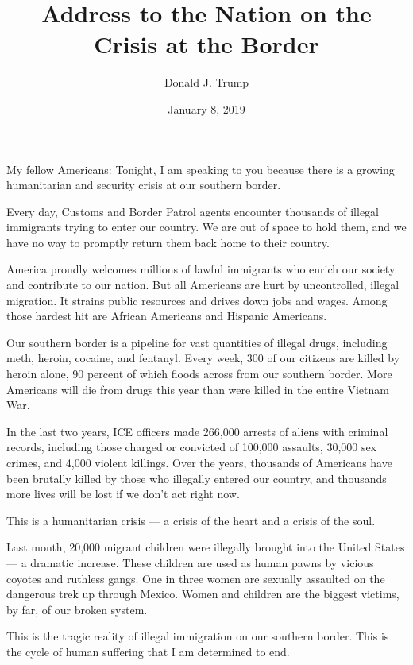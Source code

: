 \documentclass[10pt,a4paper]{article}
\begin{document}
\title{Address to the Nation on the Crisis at the Border}
\date{January 8, 2019}
\author{Donald J. Trump}

\maketitle

\noindent\linenumbers My fellow Americans: Tonight, I am speaking to you because there is a growing humanitarian and security crisis at our southern border.

Every day, Customs and Border Patrol agents encounter thousands of illegal immigrants trying to enter our country.  We are out of space to hold them, and we have no way to promptly return them back home to their country.

America proudly welcomes millions of lawful immigrants who enrich our society and contribute to our nation.  But all Americans are hurt by uncontrolled, illegal migration.  It strains public resources and drives down jobs and wages.  Among those hardest hit are African Americans and Hispanic Americans.

Our southern border is a pipeline for vast quantities of illegal drugs, including meth, heroin, cocaine, and fentanyl. Every week, 300 of our citizens are killed by heroin alone, 90 percent of which floods across from our southern border.  More Americans will die from drugs this year than were killed in the entire Vietnam War.

In the last two years, ICE officers made 266,000 arrests of aliens with criminal records, including those charged or convicted of 100,000 assaults, 30,000 sex crimes, and 4,000 violent killings.  Over the years, thousands of Americans have been brutally killed by those who illegally entered our country, and thousands more lives will be lost if we don’t act right now.

This is a humanitarian crisis — a crisis of the heart and a crisis of the soul.

Last month, 20,000 migrant children were illegally brought into the United States — a dramatic increase.  These children are used as human pawns by vicious coyotes and ruthless gangs.  One in three women are sexually assaulted on the dangerous trek up through Mexico.  Women and children are the biggest victims, by far, of our broken system.

This is the tragic reality of illegal immigration on our southern border.  This is the cycle of human suffering that I am determined to end.
\end{document}
